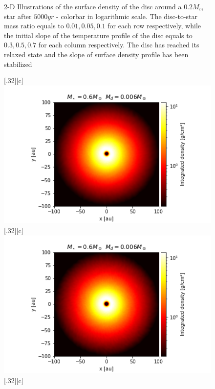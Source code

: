 \documentclass[aps,prb,twocolumn,superscriptaddress,floatfix,longbibliography]{revtex4-2}
\begin{document}
\begin{appendices}
\begin{figure}[!htbp]
  \caption{2-D Illustrations of the surface density of the disc around a $0.2 M_{\odot}$ star after $5000yr$ - colorbar in logarithmic scale. The disc-to-star mass ratio equals to $0.01, 0.05, 0.1$ for each row respectively, while the initial slope of the temperature profile of the disc equals to $0.3, 0.5, 0.7$ for each column respectively. The disc has reached its relaxed state and the slope of surface density profile has been stabilized}
\end{figure}
 
\begin{figure}[!htbp]\vspace*{3cm}
  \centering
  \subcaptionbox*{}[.32\linewidth][c]{%
    \includegraphics[width=\linewidth]{Graphs_2D/r_0.6s_0.006d_0.3q_2D.png}}\quad
  \subcaptionbox*{}[.32\linewidth][c]{%
    \includegraphics[width=\linewidth]{Graphs_2D/r_0.6s_0.006d_0.5q_2D.png}}\quad
  \subcaptionbox*{}[.32\linewidth][c]{%
}
\end{figure}
\end{appendices}
\end{document}
